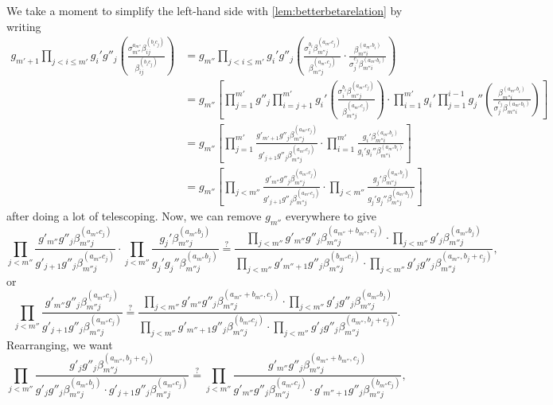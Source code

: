 We take a moment to simplify the left-hand side with \autoref{lem:betterbetarelation} by writing
\begin{align*}
	g_{m'+1}\prod_{j<i\le m'}g_i'g''_j\left(\frac{\sigma_{m''}^{a_{m''}}\beta_{ij}^{(b_ic_j)}}{\beta_{ij}^{(b_ic_j)}}\right) &= g_{m''}\prod_{j<i\le m'}g_i'g''_j\left(\frac{\sigma_i^{b_i}\beta_{m''j}^{(a_{m''}c_j)}}{\beta_{m''j}^{(a_{m''}c_j)}}\cdot\frac{\beta_{m''i}^{(a_{m''}b_i)}}{\sigma_j^{c_j}\beta_{m''i}^{(a_{m''}b_i)}}\right) \\
	&= g_{m''}\left[\prod_{j=1}^{m'}g''_j\prod_{i=j+1}^{m'}g_i'\left(\frac{\sigma_i^{b_i}\beta_{m''j}^{(a_{m''}c_j)}}{\beta_{m''j}^{(a_{m''}c_j)}}\right)\cdot
	\prod_{i=1}^{m'}g_i'\prod_{j=1}^{i-1}g_j''\left(\frac{\beta_{m''i}^{(a_{m''}b_i)}}{\sigma_j^{c_j}\beta_{m''i}^{(a_{m''}b_i)}}\right)\right] \\
	&= g_{m''}\left[\prod_{j=1}^{m'}\frac{g'_{m'+1}g''_j\beta_{m''j}^{(a_{m''}c_j)}}{g'_{j+1}g''_j\beta_{m''j}^{(a_{m''}c_j)}}\cdot
	\prod_{i=1}^{m'}\frac{g_i'\beta_{m''i}^{(a_{m''}b_i)}}{g_i'g_i''\beta_{m''i}^{(a_{m''}b_i)}}\right] \\
	&= g_{m''}\left[\prod_{j<m''}\frac{g'_{m''}g''_j\beta_{m''j}^{(a_{m''}c_j)}}{g'_{j+1}g''_j\beta_{m''j}^{(a_{m''}c_j)}}\cdot
	\prod_{j<m''}\frac{g_j'\beta_{m''j}^{(a_{m''}b_j)}}{g_j'g_j''\beta_{m''j}^{(a_{m''}b_j)}}\right]
\end{align*}
after doing a lot of telescoping. Now, we can remove $g_{m''}$ everywhere to give
\[\prod_{j<m''}\frac{g'_{m''}g''_j\beta_{m''j}^{(a_{m''}c_j)}}{g'_{j+1}g''_j\beta_{m''j}^{(a_{m''}c_j)}}\cdot
\prod_{j<m''}\frac{g_j'\beta_{m''j}^{(a_{m''}b_j)}}{g_j'g_j''\beta_{m''j}^{(a_{m''}b_j)}}
\stackrel?=
\frac{\displaystyle\prod_{j<m''}g'_{m''}g''_j\beta_{m''j}^{(a_{m''}+b_{m''},c_j)}\cdot
\displaystyle\prod_{j<m''}g'_j\beta_{m''j}^{(a_{m''}b_j)}}
{\displaystyle\prod_{j<m''}g'_{m''+1}g''_j\beta_{m''j}^{(b_{m''}c_j)}\cdot
\prod_{j<m''}g'_jg''_j\beta_{m''j}^{(a_{m''},b_j+c_j)}},\]
or
\[\prod_{j<m''}\frac{g'_{m''}g''_j\beta_{m''j}^{(a_{m''}c_j)}}{g'_{j+1}g''_j\beta_{m''j}^{(a_{m''}c_j)}}
\stackrel?=
\frac{\displaystyle\prod_{j<m''}g'_{m''}g''_j\beta_{m''j}^{(a_{m''}+b_{m''},c_j)}\cdot
\displaystyle\prod_{j<m''}g'_jg''_j\beta_{m''j}^{(a_{m''}b_j)}}
{\displaystyle\prod_{j<m''}g'_{m''+1}g''_j\beta_{m''j}^{(b_{m''}c_j)}\cdot
\prod_{j<m''}g'_jg''_j\beta_{m''j}^{(a_{m''},b_j+c_j)}}.\]
Rearranging, we want
\[\prod_{j<m''}
\frac{g'_jg''_j\beta_{m''j}^{(a_{m''},b_j+c_j)}}
{g'_jg''_j\beta_{m''j}^{(a_{m''}b_j)}\cdot
g'_{j+1}g''_j\beta_{m''j}^{(a_{m''}c_j)}}
\stackrel?=\prod_{j<m''}
\frac{g'_{m''}g''_j\beta_{m''j}^{(a_{m''}+b_{m''},c_j)}}
{g'_{m''}g''_j\beta_{m''j}^{(a_{m''}c_j)}\cdot
g'_{m''+1}g''_j\beta_{m''j}^{(b_{m''}c_j)}},\]
